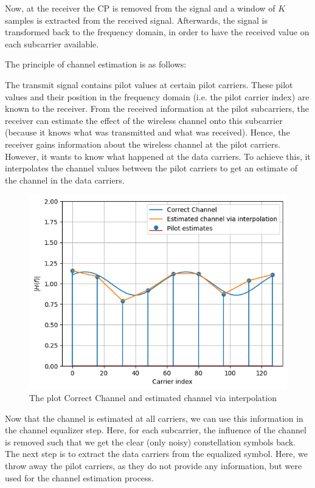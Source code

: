 Now, at the receiver the CP is removed from the signal and a window of $K$ samples is extracted from the received signal. Afterwards, the signal is transformed back to the frequency domain, in order to have the received value on each subcarrier available.

The principle of channel estimation is as follows:

The transmit signal contains pilot values at certain pilot carriers. These pilot values and their position in the frequency domain (i.e. the pilot carrier index) are known to the receiver. From the received information at the pilot subcarriers, the receiver can estimate the effect of the wireless channel onto this subcarrier (because it knows what was transmitted and what was received). Hence, the receiver gains information about the wireless channel at the pilot carriers. However, it wants to know what happened at the data carriers. To achieve this, it interpolates the channel values between the pilot carriers to get an estimate of the channel in the data carriers.

\begin{figure}[htbp]
    \centering
    \includegraphics[width=\linewidth]{../Source/results/channel_estimation}
    \caption{The plot Correct Channel and estimated channel via interpolation}
    \label{channel_estimation}
\end{figure}

Now that the channel is estimated at all carriers, we can use this information in the channel equalizer step. Here, for each subcarrier, the influence of the channel is removed such that we get the clear (only noisy) constellation symbols back. The next step is to extract the data carriers from the equalized symbol. Here, we throw away the pilot carriers, as they do not provide any information, but were used for the channel estimation process.

